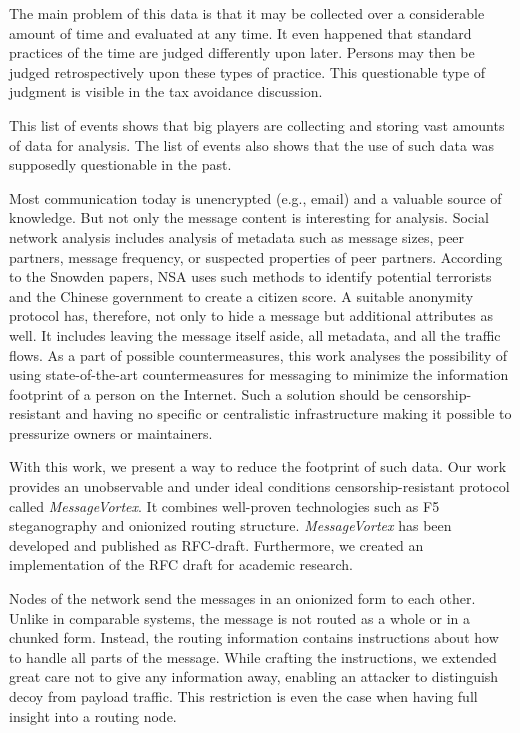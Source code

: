 \documentclass[acmsmall, screen, review]{acmart}
\begin{document}
	The main problem of this data is that it may be collected over a considerable amount of time and evaluated at any time. It even happened that standard practices of the time are judged differently upon later. Persons may then be judged retrospectively upon these types of practice. This questionable type of judgment is visible in the tax avoidance discussion\cite{Amat1999}. 
	
	This list of events shows that big players are collecting and storing vast amounts of data for analysis. The list of events also shows that the use of such data was supposedly questionable in the past. 
	
	Most communication today is unencrypted (e.g., email) and a valuable source of knowledge. But not only the message content is interesting for analysis. Social network analysis includes analysis of metadata such as message sizes, peer partners, message frequency, or suspected properties of peer partners. According to the Snowden papers\cite{Ackerman2013}, NSA uses such methods to identify potential terrorists and the Chinese government to create a citizen score\cite{socialCreditSystem}. A suitable anonymity protocol has, therefore, not only to hide a message but additional attributes as well. It includes leaving the message itself aside, all metadata, and all the traffic flows. As a part of possible countermeasures, this work analyses the possibility of using state-of-the-art countermeasures for messaging to minimize the information footprint of a person on the Internet. Such a solution should be censorship-resistant and having no specific or centralistic infrastructure making it possible to pressurize owners or maintainers. 
	
	With this work, we present a way to reduce the footprint of such data. Our work provides an unobservable and under ideal conditions censorship-resistant protocol called \emph{MessageVortex}. It combines well-proven technologies such as F5 steganography and onionized routing structure. \emph{MessageVortex} has been developed and published as RFC-draft\cite{MessageVortexRFC}. Furthermore, we created an implementation of the RFC draft for academic research. 
	
	Nodes of the network send the messages in an onionized form to each other. Unlike in comparable systems, the message is not routed as a whole or in a chunked form. Instead, the routing information contains instructions about how to handle all parts of the message. While crafting the instructions, we extended great care not to give any information away, enabling an attacker to distinguish decoy from payload traffic. This restriction is even the case when having full insight into a routing node.
	
\end{document}
